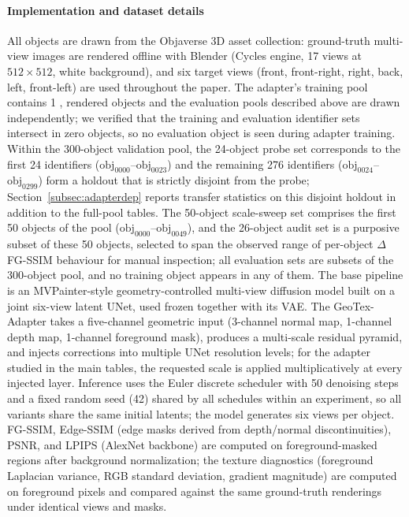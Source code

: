 \documentclass[times,twocolumn,final]{elsarticle}
\providecommand{\DIFadd}[1]{{\protect\color{red} \sf #1}} %
\begin{document}
\paragraph{\DIFadd{Implementation and dataset details}}
\DIFadd{All objects are drawn from the Objaverse 3D asset collection: ground-truth multi-view images are rendered offline with Blender (Cycles engine, 17 views at $512\times512$, white background), and six target views (front, front-right, right, back, left, front-left) are used throughout the paper. The adapter's training pool contains 1}{\DIFadd{,}}\DIFadd{118 rendered objects and the evaluation pools described above are drawn independently; we verified that the training and evaluation identifier sets intersect in zero objects, so no evaluation object is seen during adapter training. Within the 300-object validation pool, the 24-object probe set corresponds to the first 24 identifiers ($\mathrm{obj}_{0000}$--$\mathrm{obj}_{0023}$) and the remaining 276 identifiers ($\mathrm{obj}_{0024}$--$\mathrm{obj}_{0299}$) form a holdout that is strictly disjoint from the probe; Section~\ref{subsec:adapterdep} reports transfer statistics on this disjoint holdout in addition to the full-pool tables. The 50-object scale-sweep set comprises the first 50 objects of the pool ($\mathrm{obj}_{0000}$--$\mathrm{obj}_{0049}$), and the 26-object audit set is a purposive subset of these 50 objects, selected to span the observed range of per-object $\Delta$FG-SSIM behaviour for manual inspection; all evaluation sets are subsets of the 300-object pool, and no training object appears in any of them. The base pipeline is an MVPainter-style geometry-controlled multi-view diffusion model built on a joint six-view latent UNet, used frozen together with its VAE. The GeoTex-Adapter takes a five-channel geometric input (3-channel normal map, 1-channel depth map, 1-channel foreground mask), produces a multi-scale residual pyramid, and injects corrections into multiple UNet resolution levels; for the adapter studied in the main tables, the requested scale is applied multiplicatively at every injected layer. Inference uses the Euler discrete scheduler with 50 denoising steps and a fixed random seed (42) shared by all schedules within an experiment, so all variants share the same initial latents; the model generates six views per object. FG-SSIM, Edge-SSIM (edge masks derived from depth/normal discontinuities), PSNR, and LPIPS (AlexNet backbone) are computed on foreground-masked regions after background normalization; the texture diagnostics (foreground Laplacian variance, RGB standard deviation, gradient magnitude) are computed on foreground pixels and compared against the same ground-truth renderings under identical views and masks.
}
\end{document}
